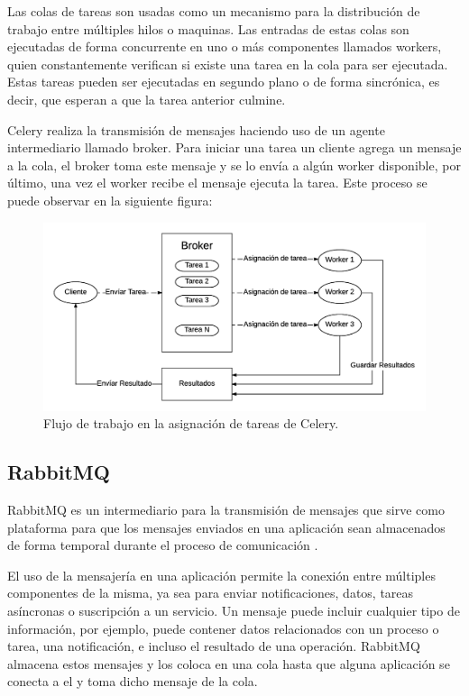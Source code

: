 Las colas de tareas son usadas como un mecanismo para la distribución de trabajo entre múltiples hilos o maquinas. Las entradas
de estas colas son ejecutadas de forma concurrente en uno o más componentes llamados workers, quien constantemente verifican
si existe una tarea en la cola para ser ejecutada. Estas tareas pueden ser ejecutadas en segundo plano o de forma sincrónica,
es decir, que esperan a que la tarea anterior culmine.

Celery realiza la transmisión de mensajes haciendo uso de un agente intermediario llamado broker. Para iniciar una tarea un cliente
agrega un mensaje a la cola, el broker toma este mensaje y se lo envía a algún worker disponible, por último, una vez el worker
recibe el mensaje ejecuta la tarea. Este proceso se puede observar en la siguiente figura:

\begin{figure}[H]
	\centering
		\includegraphics[width=.9\textwidth]{figures/celery}
	\caption{Flujo de trabajo en la asignación de tareas de Celery.}
	\label{fig:celery}
\end{figure}

\subsection{RabbitMQ}

RabbitMQ es un intermediario para la transmisión de mensajes que sirve como plataforma para que los mensajes enviados
en una aplicación sean almacenados de forma temporal durante el proceso de comunicación \cite{14}.

El uso de la mensajería en una aplicación permite la conexión entre múltiples componentes de la misma, ya sea para enviar
notificaciones, datos, tareas asíncronas o suscripción a un servicio. Un mensaje puede incluir cualquier tipo de información, por ejemplo,
puede contener datos relacionados con un proceso o tarea, una notificación, e incluso el resultado de una operación. RabbitMQ
almacena estos mensajes y los coloca en una cola hasta que alguna aplicación se conecta a el y toma dicho mensaje de la cola.

